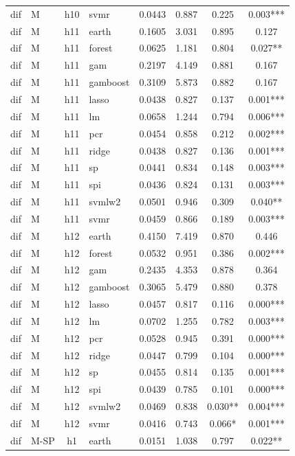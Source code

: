 \begin{ThreePartTable}
\begin{longtable}[t]{llclcccc}
dif & M & h10 & svmr & 0.0443 & 0.887 & 0.225 & 0.003***\\
\addlinespace
dif & M & h11 & earth & 0.1605 & 3.031 & 0.895 & 0.127\\
dif & M & h11 & forest & 0.0625 & 1.181 & 0.804 & 0.027**\\
dif & M & h11 & gam & 0.2197 & 4.149 & 0.881 & 0.167\\
dif & M & h11 & gamboost & 0.3109 & 5.873 & 0.882 & 0.167\\
dif & M & h11 & lasso & 0.0438 & 0.827 & 0.137 & 0.001***\\
dif & M & h11 & lm & 0.0658 & 1.244 & 0.794 & 0.006***\\
dif & M & h11 & pcr & 0.0454 & 0.858 & 0.212 & 0.002***\\
dif & M & h11 & ridge & 0.0438 & 0.827 & 0.136 & 0.001***\\
dif & M & h11 & sp & 0.0441 & 0.834 & 0.148 & 0.003***\\
dif & M & h11 & spi & 0.0436 & 0.824 & 0.131 & 0.003***\\
dif & M & h11 & svmlw2 & 0.0501 & 0.946 & 0.309 & 0.040**\\
dif & M & h11 & svmr & 0.0459 & 0.866 & 0.189 & 0.003***\\
\addlinespace
dif & M & h12 & earth & 0.4150 & 7.419 & 0.870 & 0.446\\
dif & M & h12 & forest & 0.0532 & 0.951 & 0.386 & 0.002***\\
dif & M & h12 & gam & 0.2435 & 4.353 & 0.878 & 0.364\\
dif & M & h12 & gamboost & 0.3065 & 5.479 & 0.880 & 0.378\\
dif & M & h12 & lasso & 0.0457 & 0.817 & 0.116 & 0.000***\\
dif & M & h12 & lm & 0.0702 & 1.255 & 0.782 & 0.003***\\
dif & M & h12 & pcr & 0.0528 & 0.945 & 0.391 & 0.000***\\
dif & M & h12 & ridge & 0.0447 & 0.799 & 0.104 & 0.000***\\
dif & M & h12 & sp & 0.0455 & 0.814 & 0.135 & 0.001***\\
dif & M & h12 & spi & 0.0439 & 0.785 & 0.101 & 0.000***\\
dif & M & h12 & svmlw2 & 0.0469 & 0.838 & 0.030** & 0.004***\\
dif & M & h12 & svmr & 0.0416 & 0.743 & 0.066* & 0.001***\\
\addlinespace
dif & M-SP & h1 & earth & 0.0151 & 1.038 & 0.797 & 0.022**\\

\end{longtable}
\end{ThreePartTable}

